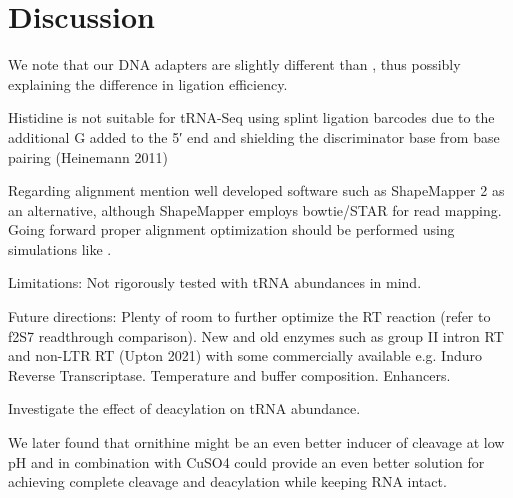 \documentclass[9pt,lineno]{elife}
\begin{document}
\section{Discussion}


We note that our DNA adapters are slightly different than \cite{Behrens2021-gb}, thus possibly explaining the difference in ligation efficiency.


Histidine is not suitable for tRNA-Seq using splint ligation barcodes due to the additional G added to the 5′ end and shielding the discriminator base from base pairing (Heinemann 2011)


Regarding alignment mention well developed software such as ShapeMapper 2 as an alternative, although ShapeMapper employs bowtie/STAR for read mapping.
Going forward proper alignment optimization should be performed using simulations like \cite{Hoffmann2018-uz}.




Limitations:
Not rigorously tested with tRNA abundances in mind.



Future directions:
Plenty of room to further optimize the RT reaction (refer to f2S7 readthrough comparison).
New and old enzymes such as group II intron RT and non-LTR RT (Upton 2021) with some commercially available e.g. Induro Reverse Transcriptase.
Temperature and buffer composition.
Enhancers.


Investigate the effect of deacylation on tRNA abundance.


We later found that ornithine might be an even better inducer of cleavage at low pH and in combination with CuSO4 could provide an even better solution for achieving complete cleavage and deacylation while keeping RNA intact.
\end{document}
